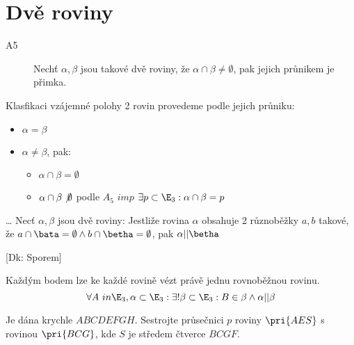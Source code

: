 
\let\braceru=\relax \let\bracelu=\relax 
\def\o#1{\setbox0=
	\hbox{$\kern2pt\overbrace{\kern-2pt#1\kern-2pt}\kern2pt$}\ht0=2.1ex\box0}
\def\to#1{\hbox{#1\rlap{\t{}}}}
\def\rad{\rm{rad}}
\def\f{\frac}
\BeginDoc{}
\section{Dvě roviny}
\begin{description}
\item[A5] Nechť $\alpha,\beta$ jsou takové dvě roviny, že $\alpha \cap \beta \ne \emptyset$, pak jejich průnikem je přimka.
\end{description}

\Poz Klasfikaci vzájemné polohy 2 rovin provedeme podle jejich průniku:
\begin{itemize}
	\item $\alpha = \beta$
	\item $\alpha\ne\beta$, pak:
		\begin{itemize}
			\item $\alpha \cap \beta = \emptyset$
			\item $\alpha \cap \beta\not\emptyset$ podle $A_5$ $imp$ $\exists p \subset \E_3 : \alpha \cap \beta = p$
		\end{itemize}

\end{itemize}
\Def \dots
{}
Necť $\alpha , \beta$ jsou dvě roviny:
Jestliže rovina $\alpha$ obsahuje 2 různoběžky $a,b$ takové, že $a\cap \bata = \emptyset \land b \cap \betha = \emptyset$, pak $\alpha || \betha$

[Dk: Sporem]

\V 
Každým bodem lze ke každé rovině vézt právě jednu rovnoběžnou rovinu.
$$\forall A \ in \E_3 , \alpha \subset \E_3: \exists ! \beta \subset \E_3 : B \in \beta \land \alpha || \beta$$

\Pr Je dána krychle $ABCDEFGH$. Sestrojte průsečnici $p$ roviny $\pri{AES}$ s rovinou $\pri{BCG}$, kde $S$ je středem čtverce $BCGF$.
\EndDoc

